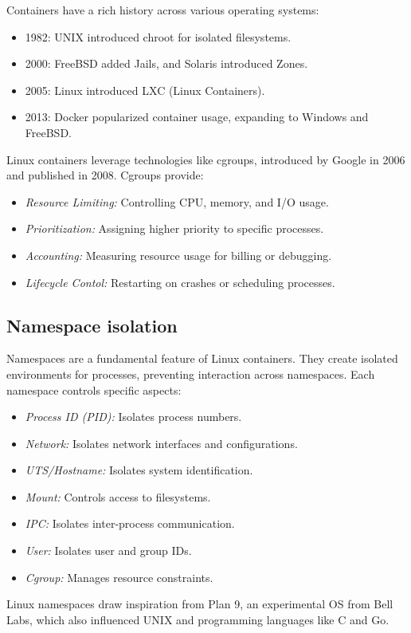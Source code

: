 Containers have a rich history across various operating systems:
\begin{itemize}
    \item 1982: UNIX introduced chroot for isolated filesystems.
    \item 2000: FreeBSD added Jails, and Solaris introduced Zones.
    \item 2005: Linux introduced LXC (Linux Containers).
    \item 2013: Docker popularized container usage, expanding to Windows and FreeBSD.
\end{itemize}
Linux containers leverage technologies like cgroups, introduced by Google in 2006 and published in 2008. Cgroups provide:
\begin{itemize}
    \item \textit{Resource Limiting:} Controlling CPU, memory, and I/O usage.
    \item \textit{Prioritization:} Assigning higher priority to specific processes.
    \item \textit{Accounting:} Measuring resource usage for billing or debugging.
    \item \textit{Lifecycle Contol:} Restarting on crashes or scheduling processes.
\end{itemize}

\subsection*{Namespace isolation}
Namespaces are a fundamental feature of Linux containers. They create isolated environments for processes, preventing interaction across namespaces. Each namespace controls specific aspects:
\begin{itemize}
    \item \textit{Process ID (PID):} Isolates process numbers.
    \item \textit{Network:} Isolates network interfaces and configurations.
    \item \textit{UTS/Hostname:} Isolates system identification.
    \item \textit{Mount:} Controls access to filesystems.
    \item \textit{IPC:} Isolates inter-process communication.
    \item \textit{User:} Isolates user and group IDs.
    \item \textit{Cgroup:} Manages resource constraints.
\end{itemize}
Linux namespaces draw inspiration from Plan 9, an experimental OS from Bell Labs, which also influenced UNIX and programming languages like C and Go.

